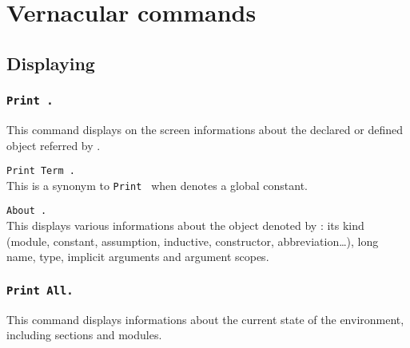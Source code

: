 \chapter[Vernacular commands]{Vernacular commands\label{Vernacular-commands}
\label{Other-commands}}

\section{Displaying}

\subsection[\tt Print {\qualid}.]{\tt Print {\qualid}.}
This command displays on the screen informations about the declared or
defined object referred by {\qualid}.

\begin{ErrMsgs}
\item {\qualid} 
\end{ErrMsgs}

\begin{Variants}
\item {\tt Print Term {\qualid}.}
\\ 
This is a synonym to {\tt Print {\qualid}} when {\qualid} denotes a
global constant. 

\item {\tt About {\qualid}.}
\label{About}
\\ 
This displays various informations about the object denoted by {\qualid}:
its kind (module, constant, assumption, inductive,
constructor, abbreviation\ldots), long name, type, implicit
arguments and argument scopes.

\end{Variants}

\subsection[\tt Print All.]{\tt Print All.}
This command displays informations about the current state of the
environment, including sections and modules.

